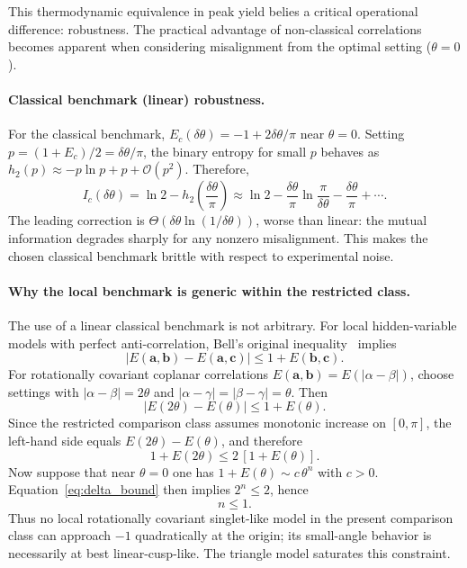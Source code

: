 \documentclass[pra,twocolumn,showpacs,preprintnumbers,amsmath,amssymb,longbibliography,
               superscriptaddress]{revtex4-2}
\begin{document}
This thermodynamic equivalence in peak yield belies a critical
operational difference: robustness.
The practical advantage of non-classical correlations becomes apparent
when considering misalignment from the optimal setting ($\theta=0$).

\paragraph{Classical {benchmark (linear)} robustness.}
{For the classical benchmark,
$E_c(\delta\theta) = -1 + 2\delta\theta / \pi$ near $\theta = 0$.
Setting $p = (1 + E_c)/2 = \delta\theta / \pi$, the binary entropy
for small $p$ behaves as
$h_2(p) \approx -p \ln p + p + \mathcal{O}(p^2)$.
Therefore,
\begin{equation}
I_c(\delta\theta)
  = \ln 2 - h_2\!\left(\frac{\delta\theta}{\pi}\right)
  \approx \ln 2
    - \frac{\delta\theta}{\pi}
      \ln\!\frac{\pi}{\delta\theta}
    - \frac{\delta\theta}{\pi}
    + \cdots .
\label{eq:Ic_expansion}
\end{equation}
The leading correction is
$\Theta(\delta\theta\ln(1/\delta\theta))$, worse than linear:
the mutual information degrades sharply for any nonzero misalignment.
This makes the chosen classical benchmark brittle with respect to
experimental noise.}

{\paragraph{Why the local benchmark is generic within the restricted class.}
The use of a linear classical benchmark is not arbitrary.
For local hidden-variable models with perfect anti-correlation,
Bell's original inequality~\cite{bell} implies
\begin{equation}
|E(\mathbf a,\mathbf b)-E(\mathbf a,\mathbf c)|
\le 1+E(\mathbf b,\mathbf c).
\label{eq:bell_original}
\end{equation}
For rotationally covariant coplanar correlations
$E(\mathbf a,\mathbf b)=E(|\alpha-\beta|)$, choose settings with
$|\alpha-\beta|=2\theta$ and
$|\alpha-\gamma|=|\beta-\gamma|=\theta$.
Then
\begin{equation}
|E(2\theta)-E(\theta)| \le 1+E(\theta).
\label{eq:bell_isotropic}
\end{equation}
Since the restricted comparison class assumes monotonic increase on
$[0,\pi]$, the left-hand side equals $E(2\theta)-E(\theta)$, and
therefore
\begin{equation}
1+E(2\theta)\le 2\,[1+E(\theta)].
\label{eq:delta_bound}
\end{equation}
Now suppose that near $\theta=0$ one has
$1+E(\theta)\sim c\,\theta^n$ with $c>0$.
Equation~\eqref{eq:delta_bound} then implies
$2^n\le 2$, hence
\begin{equation}
n\le 1.
\label{eq:n_le_1}
\end{equation}
Thus no local rotationally covariant singlet-like model in the present
comparison class can approach $-1$ quadratically at the origin; its
small-angle behavior is necessarily at best linear-cusp-like.
The triangle model saturates this constraint.}
\end{document}
